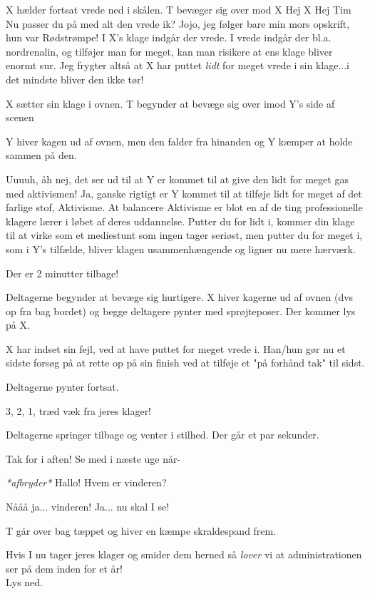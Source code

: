 \documentclass[a4paper,11pt]{article}
\begin{document}
\begin{sketch}
\scene X hælder fortsat vrede ned i skålen. T bevæger sig over mod X
 Hej X
 Hej Tim
 Nu passer du på med alt den vrede ik?
 Jojo, jeg følger bare min mors opskrift, hun var Rødstrømpe!
 I X's klage indgår der vrede. I vrede indgår der bl.a. nordrenalin, og tilføjer man for meget, kan man risikere at ens klage bliver enormt sur. 
  Jeg frygter altså at X har puttet \textit{lidt} for meget vrede i sin klage...i det mindste bliver den ikke tør!

\scene X sætter sin klage i ovnen. T begynder at bevæge sig over imod Y's side af scenen

\scene Y hiver kagen ud af ovnen, men den falder fra hinanden og Y kæmper at holde sammen på den.

  Uuuuh, åh nej, det ser ud til at Y er kommet til at give den lidt for meget gas med aktivismen! 
 Ja, ganske rigtigt er Y kommet til at tilføje lidt for meget af det farlige stof, Aktivisme. At balancere Aktivisme er blot en af de ting professionelle klagere lærer i løbet af deres uddannelse. Putter du for lidt i, kommer din klage til at virke som et mediestunt som ingen tager seriøst, men putter du for meget i, som i Y's tilfælde, bliver klagen usammenhængende og ligner nu mere hærværk.  

 Der er 2 minutter tilbage! 

\scene Deltagerne begynder at bevæge sig hurtigere. X hiver kagerne ud af ovnen (dvs op fra bag bordet) og begge deltagere pynter med sprøjteposer. Der kommer lys på X.

 X har indset sin fejl, ved at have puttet for meget vrede i. Han/hun gør nu et sidste forsøg på at rette op på sin finish ved at tilføje et "på forhånd tak" til sidst. 


\scene Deltagerne pynter fortsat.

 3, 2, 1, træd væk fra jeres klager!  

\scene Deltagerne springer tilbage og venter i stilhed. Der går et par sekunder.

 Tak for i aften! Se med i næste uge når-

 \textit{*afbryder*} Hallo! Hvem er vinderen?

 Nååå ja... vinderen! Ja... nu skal I se!

\scene T går over bag tæppet og hiver en kæmpe skraldespand frem.

 Hvis I nu tager jeres klager og smider dem herned  så \textit{lover} vi at administrationen ser på dem inden for et år! \\

\scene Lys ned.

\end{sketch}
\end{document}
